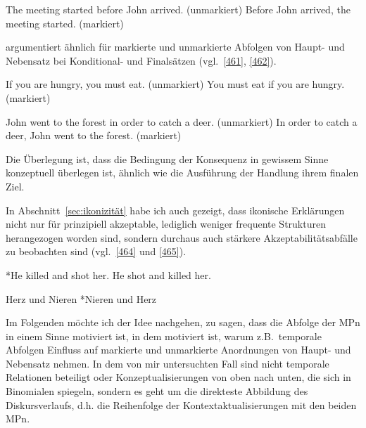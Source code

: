 \begin{exe}
	\ex\label{460}
 		\begin{xlist}
			\ex\label{460a} The meeting started before John arrived. (unmarkiert)
 			\ex\label{460b}	Before John arrived, the meeting started. (markiert)	
 		\hfill\hbox{\citet[400]{Dik1997}}	
 		\end{xlist}				
\end{exe}
\citet{Dik1997} argumentiert ähnlich für markierte und unmarkierte Abfolgen von Haupt- und Nebensatz bei Konditional- und  Finalsätzen (vgl.\ \ref{461}, \ref{462}).

\begin{exe}
	\ex\label{461}
 		\begin{xlist}
			\ex\label{461a} If you are hungry, you must eat. (unmarkiert)
 			\ex\label{461b}	You must eat if you are hungry. (markiert)
 		\end{xlist}			
\end{exe}\largerpage[2]

\begin{exe}
	\ex\label{462}
 		\begin{xlist}
			\ex\label{462a} John went to the forest in order to catch a deer. (unmarkiert)
 			\ex\label{462b}	In order to catch a deer, John went to the forest. (markiert)	
 		\end{xlist}			
	\hfill\hbox{\citet[400]{Dik1997}}
\end{exe}
Die Überlegung ist, dass die Bedingung der Konsequenz in gewissem Sinne konzeptuell überlegen ist, ähnlich wie die Ausführung der Handlung ihrem finalen Ziel.

In Abschnitt~\ref{sec:ikonizität} habe ich auch gezeigt, dass ikonische Erklärungen nicht nur für prinzipiell akzeptable, lediglich weniger frequente Strukturen herangezogen worden sind, sondern durchaus auch stärkere Akzeptabilitätsabfälle zu beobachten sind (vgl.\ \ref{464} und \ref{465}).

\begin{exe}
	\ex\label{464}
 		\begin{xlist}
			\ex\label{464a} *He killed and shot her.
 			\ex\label{464b}	He shot and killed her.	
 		\hfill\hbox{\citet[92]{Givon1991}}	
 		\end{xlist}				
\end{exe}

\begin{exe}
	\ex\label{465}
 		\begin{xlist}
			\ex\label{465a} Herz und Nieren
 			\ex\label{465b}	*Nieren und Herz
 			\hfill\hbox{\citet[140]{Plank1979}}	
 		\end{xlist}			
\end{exe}
Im Folgenden möchte ich der Idee nachgehen, zu sagen, dass die Abfolge der MPn in einem Sinne motiviert ist, in dem motiviert ist, warum z.B.\ temporale Abfolgen Einfluss auf markierte und unmarkierte Anordnungen von Haupt- und Nebensatz nehmen. In dem von mir untersuchten Fall sind nicht temporale Relationen beteiligt oder Konzeptualisierungen von oben nach unten, die sich in  Binomialen spiegeln, sondern es geht um die direkteste Abbildung des Diskursverlaufs, d.h. die Reihenfolge der Kontextaktualisierungen mit den beiden MPn.


